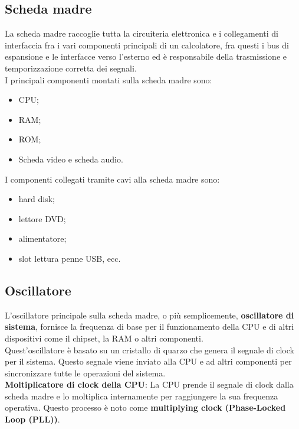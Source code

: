 \documentclass[12pt]{report}
\begin{document}
\subsection{Scheda madre}
La scheda madre raccoglie tutta la circuiteria elettronica e i collegamenti di interfaccia fra i vari componenti principali di un calcolatore, fra questi i bus di espansione e le interfacce verso l'esterno ed è responsabile della trasmissione e temporizzazione corretta dei segnali.\\
I principali componenti montati sulla scheda madre sono:
\begin{itemize}
	\item CPU;
	\item RAM;
	\item ROM;
	\item Scheda video e scheda audio.
\end{itemize}
I componenti collegati tramite cavi alla scheda madre sono:
\begin{itemize}
	\item hard disk;
	\item lettore DVD;
	\item alimentatore;
	\item slot lettura penne USB, ecc.
\end{itemize}
\subsection{Oscillatore}
L'oscillatore principale sulla scheda madre, o più semplicemente, \textbf{oscillatore di sistema}, fornisce la frequenza di base per il funzionamento della CPU e di altri dispositivi come il chipset, la RAM o altri componenti.\\
Quest'oscillatore è basato su un cristallo di quarzo che genera il segnale di clock per il sistema. Questo segnale viene inviato alla CPU e ad altri componenti per sincronizzare tutte le operazioni del sistema. \\
\textbf{Moltiplicatore di clock della CPU}: La CPU prende il segnale di clock dalla scheda madre e lo moltiplica internamente per raggiungere la sua frequenza operativa. Questo processo è noto come \textbf{multiplying clock (Phase-Locked Loop (PLL))}.
\end{document}
